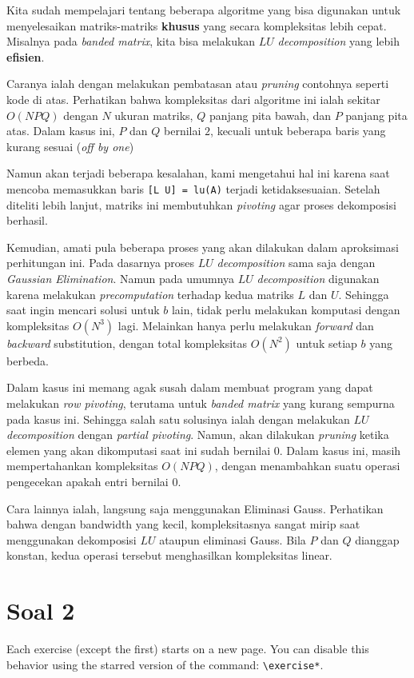 \documentclass[12pt, a4paper, onecolumn, oneside, final]{report}
\begin{document}
Kita sudah mempelajari tentang beberapa algoritme yang bisa digunakan untuk menyelesaikan matriks-matriks \textbf{khusus} yang secara kompleksitas lebih cepat. Misalnya pada \textit{banded matrix}, kita bisa melakukan $LU$ \textit{decomposition} yang lebih \textbf{efisien}.

Caranya ialah dengan melakukan pembatasan atau \textit{pruning} contohnya seperti kode di atas. Perhatikan bahwa kompleksitas dari algoritme ini ialah sekitar $O(NPQ)$ dengan $N$ ukuran matriks, $Q$ panjang pita bawah, dan $P$ panjang pita atas. Dalam kasus ini, $P$ dan $Q$ bernilai $2$, kecuali untuk beberapa baris yang kurang sesuai (\textit{off by one})

Namun akan terjadi beberapa kesalahan, kami mengetahui hal ini karena saat mencoba memasukkan baris \texttt{[L U] = lu(A)} terjadi ketidaksesuaian. Setelah diteliti lebih lanjut, matriks ini membutuhkan \textit{pivoting} agar proses dekomposisi berhasil.

Kemudian, amati pula beberapa proses yang akan dilakukan dalam aproksimasi perhitungan ini. Pada dasarnya proses $LU$ \textit{decomposition} sama saja dengan \textit{Gaussian Elimination}. Namun pada umumnya $LU$ \textit{decomposition} digunakan karena melakukan \textit{precomputation} terhadap kedua matriks $L$ dan $U$. Sehingga saat ingin mencari solusi untuk $b$ lain, tidak perlu melakukan komputasi dengan kompleksitas $O(N^3)$ lagi. Melainkan hanya perlu melakukan \textit{forward} dan \textit{backward} substitution, dengan total kompleksitas $O(N^2)$ untuk setiap $b$ yang berbeda.

Dalam kasus ini memang agak susah dalam membuat program yang dapat melakukan \textit{row pivoting}, terutama untuk \textit{banded matrix} yang kurang sempurna pada kasus ini. Sehingga salah satu solusinya ialah dengan melakukan $LU$ \textit{decomposition} dengan \textit{partial pivoting}. Namun, akan dilakukan \textit{pruning} ketika elemen yang akan dikomputasi saat ini sudah bernilai $0$. Dalam kasus ini, masih mempertahankan kompleksitas $O(NPQ)$, dengan menambahkan suatu operasi pengecekan apakah entri bernilai $0$.

Cara lainnya ialah, langsung saja menggunakan Eliminasi Gauss. Perhatikan bahwa dengan bandwidth yang kecil, kompleksitasnya sangat mirip saat menggunakan dekomposisi $LU$ ataupun eliminasi Gauss. Bila $P$ dan $Q$ dianggap konstan, kedua operasi tersebut menghasilkan kompleksitas linear.


\section*{Soal 2}
Each exercise (except the first) starts on a new page. You can disable this behavior using the starred version of the command: \verb|\exercise*|.
\end{document}
